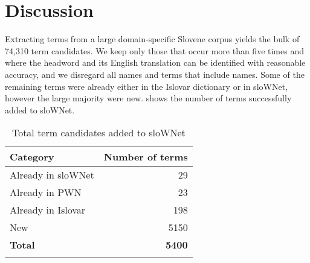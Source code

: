 \documentclass[output=paper]{LSP/langsci}
\begin{document}
\begin{table}
\caption{Polysemous headword, ID to be selected manually}
\label{tab:vintar:7}
\end{table}

\section{Discussion}\label{sec:vintar:5}

Extracting terms from a large domain-specific Slovene corpus yields the bulk of 74,310 term candidates. We keep only those that occur more than five times and where the headword and its English translation can be identified with reasonable accuracy, and we disregard all names and terms that include names. Some of the remaining terms were already either in the Islovar dictionary or in sloWNet, however the large majority were new.  shows the number of terms successfully added to sloWNet. 

\begin{table}
\begin{tabular}{lr}
\lsptoprule
\textbf{Category} & \textbf{Number of terms} \\
\midrule
Already in sloWNet & 29 \\
Already in PWN &  23 \\
Already in Islovar & 198 \\
New & 5150 \\
\textbf{Total} & \textbf{5400} \\
\lspbottomrule
\end{tabular}
\caption{Total term candidates added to sloWNet}
\label{tab:vintar:8}
\end{table}
\end{document}
